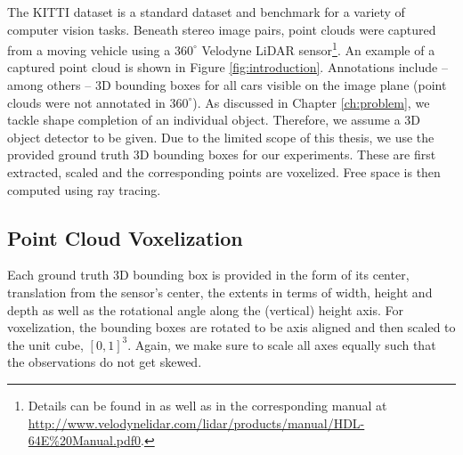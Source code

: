The KITTI dataset
is a standard dataset and benchmark for a variety of computer vision tasks.
Beneath stereo image pairs, point clouds were captured from a moving vehicle
using a $360^\circ$ Velodyne LiDAR sensor\footnote{
  Details can be found in \cite{GeigerLenzUrtasun:2012} as well as in the corresponding
  manual at \url{http://www.velodynelidar.com/lidar/products/manual/HDL-64E\%20Manual.pdf0}.
}. An example of a captured point cloud is shown in Figure \ref{fig:introduction}.
Annotations
include -- among others -- 3D bounding boxes for all cars visible
on the image plane (\ie point clouds were not annotated in $360^\circ$).
As discussed in Chapter \ref{ch:problem}, we tackle shape completion of
an individual object. Therefore, we assume a 3D object detector to be given.
Due to the limited scope of this thesis, we use the provided ground truth 3D
bounding boxes for our experiments. These are first extracted, scaled and
the corresponding points are voxelized. Free space is then computed using
ray tracing.


\subsection{Point Cloud Voxelization}

Each ground truth 3D bounding box is provided in the form of its center,
\ie translation from the sensor's center, the extents in terms of width,
height and depth as well as the rotational angle along the (vertical)
height axis. For voxelization, the bounding boxes are rotated
to be axis aligned and then scaled to the unit cube, \ie $[0,1]^3$.
Again, we make sure to scale all axes equally such that the
observations do not get skewed.

